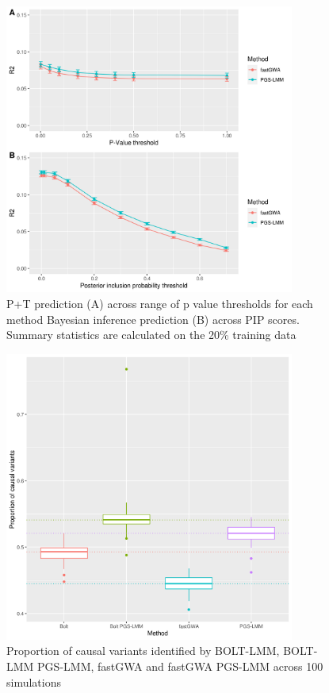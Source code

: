 \documentclass{article}
\begin{document}
\begin{figure}[h!]
  \includegraphics[width=0.85\textwidth]{images/SFig5.png}
  \caption{P+T prediction (A) across range of p value thresholds for each method Bayesian inference prediction (B) across PIP scores. Summary statistics are calculated on the 20\% training data}
\end{figure}

\begin{figure}[h!]
  \includegraphics[width=0.85\textwidth]{images/SFig6.png}
  \caption{Proportion of causal variants identified by BOLT-LMM, BOLT-LMM PGS-LMM, fastGWA and fastGWA PGS-LMM across 100 simulations}
\end{figure}
\end{document}
